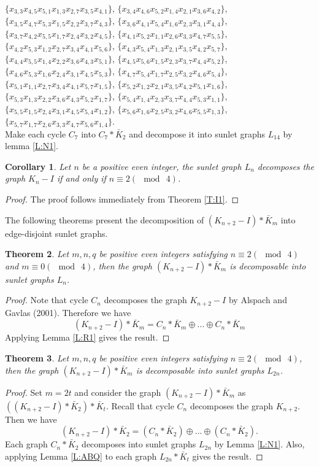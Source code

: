 \documentclass[12pt]{report}
\newtheorem{thm}{Theorem}[section]
\newtheorem{cor}[thm]{Corollary}
\begin{document}
$\{x_{3,3}x_{4,5}x_{5,1}x_{1,3}x_{2,7}x_{3,5}x_{4,1}\}$,
$\{x_{3,4}x_{4,6}x_{5,2}x_{1,4}x_{2,1}x_{3,6}x_{4,2}\}$,
$\{x_{3,5}x_{4,7}x_{5,3}x_{1,5}x_{2,2}x_{3,7}x_{4,3}\}$,
$\{x_{3,6}x_{4,1}x_{5,4}x_{1,6}x_{2,3}x_{3,1}x_{4,4}\}$,
$\{x_{3,7}x_{4,2}x_{5,5}x_{1,7}x_{2,4}x_{3,2}x_{4,5}\}$,
$\{x_{4,1}x_{5,2}x_{1,1}x_{2,6}x_{3,3}x_{4,7}x_{5,5}\}$,
$\{x_{4,2}x_{5,3}x_{1,2}x_{2,7}x_{3,4}x_{4,1}x_{5,6}\}$,
$\{x_{4,3}x_{5,4}x_{1,3}x_{2,1}x_{3,5}x_{4,2}x_{5,7}\}$,
$\{x_{4,4}x_{5,5}x_{1,4}x_{2,2}x_{3,6}x_{4,3}x_{5,1}\}$,
$\{x_{4,5}x_{5,6}x_{1,5}x_{2,3}x_{3,7}x_{4,4}x_{5,2}\}$,
$\{x_{4,6}x_{5,3}x_{1,6}x_{2,4}x_{3,1}x_{4,5}x_{5,3}\}$,
$\{x_{4,7}x_{5,4}x_{1,7}x_{2,5}x_{3,2}x_{4,6}x_{5,4}\}$,
$\{x_{5,1}x_{1,1}x_{2,7}x_{3,4}x_{4,1}x_{5,7}x_{1,5}\}$,
$\{x_{5,2}x_{1,2}x_{2,1}x_{3,5}x_{4,2}x_{5,1}x_{1,6}\}$,
$\{x_{5,3}x_{1,3}x_{2,2}x_{3,6}x_{4,3}x_{5,2}x_{1,7}\}$,
$\{x_{5,4}x_{1,4}x_{2,3}x_{3,7}x_{4,4}x_{5,3}x_{1,1}\}$,
$\{x_{5,5}x_{1,5}x_{2,4}x_{3,1}x_{4,5}x_{5,4}x_{1,2}\}$,
$\{x_{5,6}x_{1,6}x_{2,5}x_{3,2}x_{4,6}x_{5,5}x_{1,3}\}$,
$\{x_{5,7}x_{1,7}x_{2,6}x_{3,3}x_{4,7}x_{5,6}x_{1,4}\}$.\\
Make each cycle $C_7$ into $C_7*\bar{K}_2$ and decompose it into
sunlet graphs $L_{14}$ by lemma \ref{L:N1}.
\begin{cor}
Let $n$ be a positive even integer, the sunlet graph $L_n$
decomposes the graph $K_n-I$ if and only if $n\equiv 2(\mod\ 4)$.
\end{cor}
\begin{proof}
The proof follows immediately from Theorem \ref{T:I1}.
\end{proof}
The following theorems present the decomposition of $(K_{n+2}-I)*\bar{K}_m$ into edge-disjoint sunlet graphs.
\begin{thm}
Let $m,n,q$ be positive even integers satisfying $n\equiv 2(\mod\ 4)$
and $m\equiv 0(\mod\ 4)$, then the graph $(K_{n+2}-I)*\bar{K}_m$ is
decomposable into sunlet graphs $L_n$.
\end{thm}
\begin{proof}
Note that cycle $C_n$ decomposes the graph $K_{n+2}-I$ by Alspach
and Gavlas (2001). Therefore we have
$$(K_{n+2}-I)*\bar{K}_m=C_n*\bar{K}_m\oplus...\oplus C_n*\bar{K}_m$$
Applying Lemma \ref{L:R1} gives the result.
\end{proof}
\begin{thm}
Let $m,n,q$ be positive even integers satisfying $n\equiv 2 (\mod\
4)$, then the graph $(K_{n+2}-I)*\bar{K}_m$ is decomposable into
sunlet graphs $L_{2n}$.
\end{thm}
\begin{proof}
Set $m=2t$ and consider the graph $(K_{n+2}-I)*\bar{K}_m$ as
$((K_{n+2}-I)*\bar{K}_2)*\bar{K}_t$. Recall that cycle $C_n$
decomposes the graph $K_{n+2}$. Then we have
$$(K_{n+2}-I)*\bar{K}_2=(C_n*\bar{K}_2)\oplus...\oplus(C_n*\bar{K}_2).$$
Each graph $C_n*\bar{K}_2$ decomposes into sunlet graphs $L_{2n}$ by
Lemma \ref{L:N1}. Also, applying Lemma \ref{L:ABQ} to each graph
$L_{2n}*\bar{K}_t$ gives the result.
\end{proof}
\end{document}

